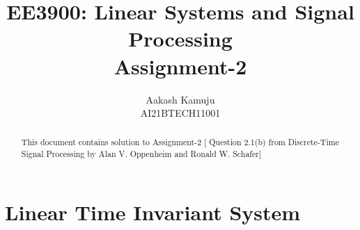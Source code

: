 \documentclass[journal,12pt,twocolumn]{IEEEtran}
\numberwithin{equation}{section}
\begin{document}
                             
\title{ EE3900: Linear Systems and Signal Processing \\ {Assignment-2}}
\author{Aakash Kamuju\\ \normalsize AI21BTECH11001 }
 \maketitle 
 \begin{abstract}
 This document contains solution to Assignment-2 [ Question 2.1(b) from Discrete-Time Signal Processing by Alan V. Oppenheim and Ronald W. Schafer]
 \end{abstract}
 \section*{Linear Time Invariant System}
\end{document}
